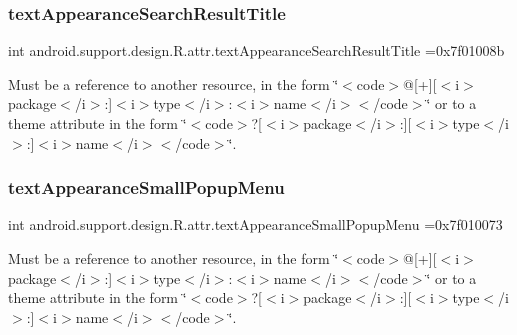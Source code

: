 \subsubsection{\texorpdfstring{text\+Appearance\+Search\+Result\+Title}{textAppearanceSearchResultTitle}}
{\footnotesize\ttfamily int android.\+support.\+design.\+R.\+attr.\+text\+Appearance\+Search\+Result\+Title =0x7f01008b\hspace{0.3cm}{\ttfamily [static]}}

Must be a reference to another resource, in the form \char`\"{}$<$code$>$@\mbox{[}+\mbox{]}\mbox{[}$<$i$>$package$<$/i$>$\+:\mbox{]}$<$i$>$type$<$/i$>$\+:$<$i$>$name$<$/i$>$$<$/code$>$\char`\"{} or to a theme attribute in the form \char`\"{}$<$code$>$?\mbox{[}$<$i$>$package$<$/i$>$\+:\mbox{]}\mbox{[}$<$i$>$type$<$/i$>$\+:\mbox{]}$<$i$>$name$<$/i$>$$<$/code$>$\char`\"{}. \mbox{\label{classandroid_1_1support_1_1design_1_1R_1_1attr_a149652ce8ee803d221fe3d2d84235adc}} 
\subsubsection{\texorpdfstring{text\+Appearance\+Small\+Popup\+Menu}{textAppearanceSmallPopupMenu}}
{\footnotesize\ttfamily int android.\+support.\+design.\+R.\+attr.\+text\+Appearance\+Small\+Popup\+Menu =0x7f010073\hspace{0.3cm}{\ttfamily [static]}}

Must be a reference to another resource, in the form \char`\"{}$<$code$>$@\mbox{[}+\mbox{]}\mbox{[}$<$i$>$package$<$/i$>$\+:\mbox{]}$<$i$>$type$<$/i$>$\+:$<$i$>$name$<$/i$>$$<$/code$>$\char`\"{} or to a theme attribute in the form \char`\"{}$<$code$>$?\mbox{[}$<$i$>$package$<$/i$>$\+:\mbox{]}\mbox{[}$<$i$>$type$<$/i$>$\+:\mbox{]}$<$i$>$name$<$/i$>$$<$/code$>$\char`\"{}. \mbox{\label{classandroid_1_1support_1_1design_1_1R_1_1attr_adfa6d58ea9caa8987856e8baa586f3d4}} 
